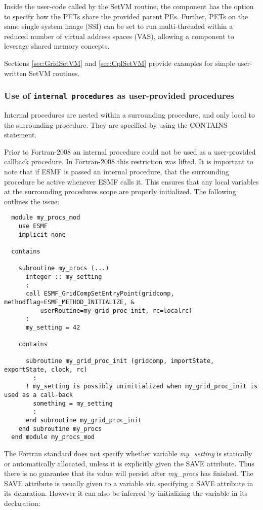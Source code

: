Inside the user-code called by the SetVM routine, the component has the option to specify how the PETs share the provided parent PEs. Further, PETs on the same single system image (SSI) can be set to run multi-threaded within a reduced number of virtual address spaces (VAS), allowing a component to leverage shared memory concepts.

Sections \ref{sec:GridSetVM} and \ref{sec:CplSetVM} provide examples for
simple user-written SetVM routines.

\subsubsection{Use of {\tt internal procedures} as user-provided procedures}
\label{sec:AppDriverIntProc}

Internal procedures are nested within a surrounding procedure, and only local to the surrounding procedure.
They are specified by using the CONTAINS statement.

Prior to Fortran-2008 an internal procedure could not be used as a user-provided callback procedure.
In Fortran-2008 this restriction was lifted.  It is important to note that if ESMF is passed an internal
procedure, that the surrounding procedure be active whenever ESMF calls it.  This ensures that any
local variables at the surrounding procedures scope are properly initialized.  The following outlines
the issue:

\begin{verbatim}
  module my_procs_mod
    use ESMF
    implicit none

  contains

    subroutine my_procs (...)
      integer :: my_setting
      :
      call ESMF_GridCompSetEntryPoint(gridcomp, methodflag=ESMF_METHOD_INITIALIZE, &
          userRoutine=my_grid_proc_init, rc=localrc)
      :
      my_setting = 42

    contains

      subroutine my_grid_proc_init (gridcomp, importState, exportState, clock, rc)
        :
      ! my_setting is possibly uninitialized when my_grid_proc_init is used as a call-back
        something = my_setting
        :
      end subroutine my_grid_proc_init
    end subroutine my_procs
  end module my_procs_mod
\end{verbatim}

The Fortran standard does not specify whether variable {\it my\_setting} is statically or
automatically allocated, unless it is explicitly given the SAVE attribute.  Thus there is no
guarantee that its value will persist after {\it my\_procs} has finished.  The SAVE attribute
is usually given to a variable via specifying a SAVE attribute in its delaration.  However it can
also be inferred by initializing the variable in its declaration:

